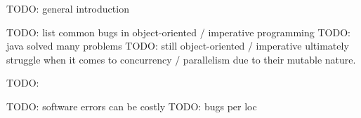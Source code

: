 TODO: general introduction %


TODO: list common bugs in object-oriented / imperative programming
TODO: java solved many problems 
TODO: still object-oriented / imperative ultimately struggle when it comes to concurrency / parallelism due to their mutable nature.

TODO: \cite{vipindeep_list_2005}

TODO: software errors can be costly %
TODO: bugs per loc %